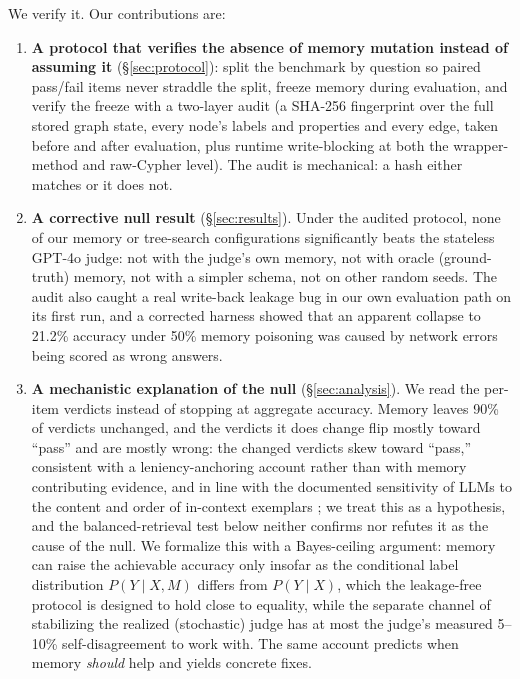 \documentclass[]{ceurart}
\begin{document}
We verify it. Our contributions are:

\begin{enumerate}
    \item \textbf{A protocol that verifies the absence of memory mutation instead of assuming it} (\S\ref{sec:protocol}): split the benchmark by question so paired pass/fail items never straddle the split, freeze memory during evaluation, and verify the freeze with a two-layer audit (a SHA-256 fingerprint over the full stored graph state, every node's labels and properties and every edge, taken before and after evaluation, plus runtime write-blocking at both the wrapper-method and raw-Cypher level). The audit is mechanical: a hash either matches or it does not.
    \item \textbf{A corrective null result} (\S\ref{sec:results}). Under the audited protocol, none of our memory or tree-search configurations significantly beats the stateless GPT-4o judge: not with the judge's own memory, not with oracle (ground-truth) memory, not with a simpler schema, not on other random seeds. The audit also caught a real write-back leakage bug in our own evaluation path on its first run, and a corrected harness showed that an apparent collapse to 21.2\% accuracy under 50\% memory poisoning was caused by network errors being scored as wrong answers.
    \item \textbf{A mechanistic explanation of the null} (\S\ref{sec:analysis}). We read the per-item verdicts instead of stopping at aggregate accuracy. Memory leaves 90\% of verdicts unchanged, and the verdicts it does change flip mostly toward ``pass'' and are mostly wrong: the changed verdicts skew toward ``pass,'' consistent with a leniency-anchoring account rather than with memory contributing evidence, and in line with the documented sensitivity of LLMs to the content and order of in-context exemplars \citep{lu2022fantastically, zhao2021calibrate}; we treat this as a hypothesis, and the balanced-retrieval test below neither confirms nor refutes it as the cause of the null. We formalize this with a Bayes-ceiling argument: memory can raise the achievable accuracy only insofar as the conditional label distribution $P(Y\mid X,M)$ differs from $P(Y\mid X)$, which the leakage-free protocol is designed to hold close to equality, while the separate channel of stabilizing the realized (stochastic) judge has at most the judge's measured 5--10\% self-disagreement to work with. The same account predicts when memory \emph{should} help and yields concrete fixes.
\end{enumerate}
\end{document}
